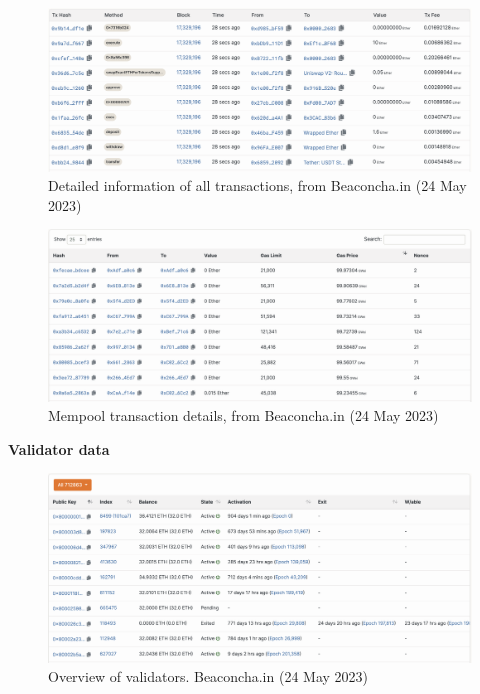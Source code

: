 \documentclass[UTF8]{article}
\begin{document}
\begin{figure}[htbp]
\begin{center}
\includegraphics[width=0.9\linewidth]{images/btxns}
\caption{Detailed information of all transactions, from Beaconcha.in (24 May 2023)}
\label{fig:btxns}
\end{center}
\end{figure}

\begin{figure}[htbp]
\begin{center}
\includegraphics[width=0.9\linewidth]{images/bmempool}
\caption{Mempool transaction details, from Beaconcha.in (24 May 2023)}
\label{fig:bmempool}
\end{center}
\end{figure}
\clearpage


\textbf{Validator data}
\begin{figure}[htbp]
\begin{center}
\includegraphics[width=0.9\linewidth]{images/bvalidators}
\caption{Overview of validators. Beaconcha.in (24 May 2023)}
\label{fig:bvalidators}
\end{center}
\end{figure}
\end{document}

